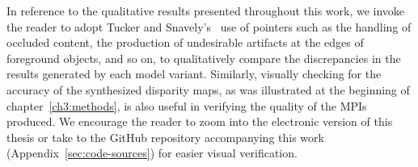In reference to the qualitative results presented throughout this work, we invoke the reader to adopt Tucker and Snavely's~\cite{single_view_mpi} use of pointers such as the handling of occluded content, the production of undesirable artifacts at the edges of foreground objects, and so on, to qualitatively compare the discrepancies in the results generated by each model variant. Similarly, visually checking for the accuracy of the synthesized disparity maps, as was illustrated at the beginning of chapter~\ref{ch3:methods}, is also useful in verifying the quality of the MPIs produced. We encourage the reader to zoom into the electronic version of this thesis or take to the GitHub repository accompanying this work (Appendix~\ref{sec:code-sources}) for easier visual verification.





